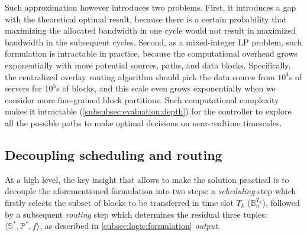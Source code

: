 Such approximation however introduces two problems. 
First, it introduces a gap with the theoretical optimal result, because there is a certain probability that maximizing the allocated bandwidth in one cycle would not result in maximized bandwidth in the subsequent cycles.
Second, as a mixed-integer LP problem, such formulation is intractable in practice, because the computational overhead grows exponentially with more potential sources, paths, and data blocks. Specifically, the centralized overlay routing algorithm should pick the data source from $10^4$s of servers for $10^5$s of blocks, and this scale even grows exponentially when we consider more fine-grained block partitions. Such computational complexity makes it intractable (\Section\ref{subsubsec:evaluation:depth}) for the controller to explore all the possible paths to make optimal decisions on near-realtime timescales.


\subsection{Decoupling scheduling and routing}
\label{subsec:logic:separation}

At a high level, the key insight that allows \name to make the solution practical is
to decouple the aforementioned formulation into two steps:
a {\em scheduling} step which firstly selects the subset of blocks to be transferred in time slot $T_k$
($\mathbb{B}^{T_k}_n$), followed by a subsequent {\em routing}
step which determines the residual three tuples: $\langle \mathbb{S}^*, \mathbb{P}^*, f \rangle$, as described in \Section\ref{subsec:logic:formulation} {\em output}.

